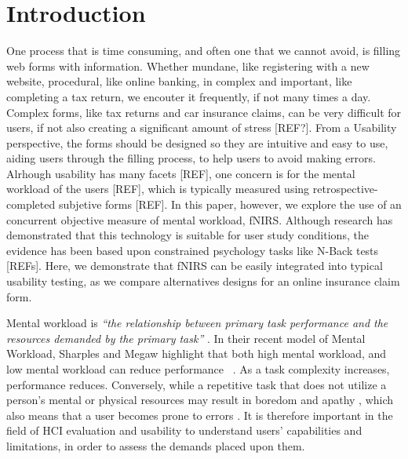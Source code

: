 \documentclass[../main/Feedback.tex]{subfiles}
\begin{document}
\section{Introduction}
One process that is time consuming, and often one that we cannot avoid, is filling web forms with information.
Whether mundane, like registering with a new website, procedural, like online banking, in complex and important, like completing a tax return, we encouter it frequently, if not many times a day. Complex forms, like tax returns and car insurance claims, can be very difficult for users, if not also creating a significant amount of stress [REF?].
From a Usability perspective, the forms should be designed so they are intuitive and easy to use, aiding users through the filling process, to help users to avoid making errors. Alrhough usability has many facets [REF], one concern is for the mental workload of the users [REF], which is typically measured using retrospective-completed subjetive forms [REF]. In this paper, however, we explore the use of an concurrent objective measure of mental workload, fNIRS. Although research has demonstrated that this technology is suitable for user study conditions, the evidence has been based upon constrained psychology tasks like N-Back tests [REFs]. Here, we demonstrate that fNIRS can be easily integrated into typical usability testing, as we compare alternatives designs for an online insurance claim form.

Mental workload is \emph{``the relationship between primary task performance and the resources demanded by the primary task''} \cite{wilson2015evaluation}. In their recent model of Mental Workload, Sharples and Megaw highlight that both high mental workload, and low mental workload can reduce performance ~\cite{wilson2015evaluation}. As a task complexity increases, performance reduces. Conversely, while a repetitive task that does not utilize a person's mental or physical resources may result in boredom and apathy \cite{afergan2014dynamic}, which also means that a user becomes prone to errors \cite{pekrun2010boredom}.
It is therefore important in the field of HCI evaluation and usability to understand users' capabilities and limitations, in order to assess the demands placed upon them.
\end{document}
